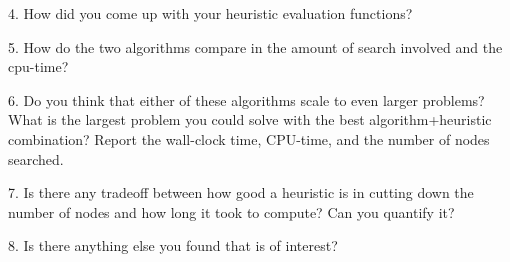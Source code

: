 4. How did you come up with your heuristic evaluation functions?

5. How do the two algorithms compare in the amount of search involved and the cpu-time?

6. Do you think that either of these algorithms scale to even larger problems? What is the largest problem you could solve with the best algorithm+heuristic combination? Report the wall-clock time, CPU-time, and the number of nodes searched.

7. Is there any tradeoff between how good a heuristic is in cutting down the number of nodes and how long it took to compute? Can you quantify it?

8. Is there anything else you found that is of interest?


